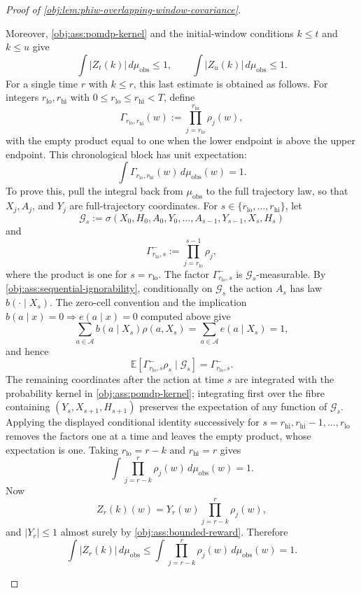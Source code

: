 \begin{proof}[Proof of \cref{obj:lem:phiw-overlapping-window-covariance}]
\begin{enumerate}
Moreover, \cref{obj:ass:pomdp-kernel} and the initial-window conditions \(k\le t\) and \(k\le u\) give
\[
\int |Z_t(k)|\,d\mu_{\mathrm{obs}}\le 1,
\qquad
\int |Z_u(k)|\,d\mu_{\mathrm{obs}}\le 1 .
\]
For a single time \(r\) with \(k\le r\), this last estimate is obtained as follows. For integers \(r_{\mathrm{lo}},r_{\mathrm{hi}}\) with \(0\le r_{\mathrm{lo}}\le r_{\mathrm{hi}}<T\), define
\[
\Gamma_{r_{\mathrm{lo}},r_{\mathrm{hi}}}(w)
:=
\prod_{j=r_{\mathrm{lo}}}^{r_{\mathrm{hi}}}\rho_j(w),
\]
with the empty product equal to one when the lower endpoint is above the upper endpoint. This chronological block has unit expectation:
\[
\int \Gamma_{r_{\mathrm{lo}},r_{\mathrm{hi}}}(w)\,d\mu_{\mathrm{obs}}(w)=1 .
\]
To prove this, pull the integral back from \(\mu_{\mathrm{obs}}\) to the full trajectory law, so that \(X_j,A_j\), and \(Y_j\) are full-trajectory coordinates. For \(s\in\{r_{\mathrm{lo}},\ldots,r_{\mathrm{hi}}\}\), let
\[
\mathscr G_s
:=
\sigma(X_0,H_0,A_0,Y_0,\ldots,A_{s-1},Y_{s-1},X_s,H_s)
\]
and
\[
\Gamma^-_{r_{\mathrm{lo}},s}
:=
\prod_{j=r_{\mathrm{lo}}}^{s-1}\rho_j,
\]
where the product is one for \(s=r_{\mathrm{lo}}\). The factor \(\Gamma^-_{r_{\mathrm{lo}},s}\) is \(\mathscr G_s\)-measurable. By \cref{obj:ass:sequential-ignorability}, conditionally on \(\mathscr G_s\) the action \(A_s\) has law \(b(\cdot\mid X_s)\). The zero-cell convention and the implication \(b(a\mid x)=0\Rightarrow e(a\mid x)=0\) computed above give
\[
\sum_{a\in\mathcal A} b(a\mid X_s)\rho(a,X_s)
=
\sum_{a\in\mathcal A} e(a\mid X_s)
=
1,
\]
and hence
\[
\mathbb E\!\left[
\Gamma^-_{r_{\mathrm{lo}},s}\rho_s
\mid \mathscr G_s
\right]
=
\Gamma^-_{r_{\mathrm{lo}},s} .
\]
The remaining coordinates after the action at time \(s\) are integrated with the probability kernel in \cref{obj:ass:pomdp-kernel}; integrating first over the fibre containing \((Y_s,X_{s+1},H_{s+1})\) preserves the expectation of any function of \(\mathscr G_s\). Applying the displayed conditional identity successively for \(s=r_{\mathrm{hi}},r_{\mathrm{hi}}-1,\ldots,r_{\mathrm{lo}}\) removes the factors one at a time and leaves the empty product, whose expectation is one. Taking \(r_{\mathrm{lo}}=r-k\) and \(r_{\mathrm{hi}}=r\) gives
\[
\int \prod_{j=r-k}^{r}\rho_j(w)\,d\mu_{\mathrm{obs}}(w)=1 .
\]
Now
\[
Z_r(k)(w)
=
Y_r(w)\prod_{j=r-k}^{r}\rho_j(w),
\]
and \(|Y_r|\le 1\) almost surely by \cref{obj:ass:bounded-reward}. Therefore
\[
\int |Z_r(k)|\,d\mu_{\mathrm{obs}}
\le
\int \prod_{j=r-k}^{r}\rho_j(w)\,d\mu_{\mathrm{obs}}(w)
=
1 .
\]


\end{enumerate}
\end{proof}
